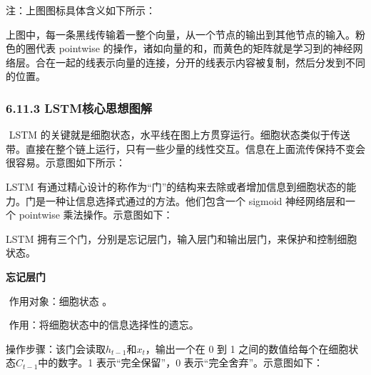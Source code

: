 
注：上图图标具体含义如下所示：


​
上图中，每一条黑线传输着一整个向量，从一个节点的输出到其他节点的输入。粉色的圈代表
pointwise
的操作，诸如向量的和，而黄色的矩阵就是学习到的神经网络层。合在一起的线表示向量的连接，分开的线表示内容被复制，然后分发到不同的位置。

\subsubsection{6.11.3
LSTM核心思想图解}\label{lstmux6838ux5fc3ux601dux60f3ux56feux89e3}

​ LSTM
的关键就是细胞状态，水平线在图上方贯穿运行。细胞状态类似于传送带。直接在整个链上运行，只有一些少量的线性交互。信息在上面流传保持不变会很容易。示意图如下所示：


LSTM
有通过精心设计的称作为``门''的结构来去除或者增加信息到细胞状态的能力。门是一种让信息选择式通过的方法。他们包含一个
sigmoid 神经网络层和一个 pointwise 乘法操作。示意图如下：


LSTM
拥有三个门，分别是忘记层门，输入层门和输出层门，来保护和控制细胞状态。

\textbf{忘记层门}

​ 作用对象：细胞状态 。

​ 作用：将细胞状态中的信息选择性的遗忘。

​ 操作步骤：该门会读取\(h_{t-1}\)和\(x_t\)，输出一个在 0 到 1
之间的数值给每个在细胞状态\(C_{t-1}​\)中的数字。1 表示``完全保留''，0
表示``完全舍弃''。示意图如下：


